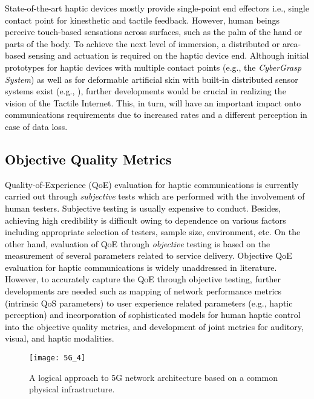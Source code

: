 \documentclass[journal]{IEEEtran}
\begin{document}
\textcolor{black}{State-of-the-art haptic devices mostly provide single-point end effectors i.e., single contact point for kinesthetic and tactile feedback. However, human beings perceive touch-based sensations across surfaces, such as the palm of the hand or parts of the body. To achieve the next level of immersion, a distributed or area-based sensing and actuation is required on the haptic device end. Although initial prototypes for haptic devices with multiple contact points (e.g., the \emph{CyberGrasp System}) as well as for deformable artificial skin with built-in distributed sensor systems exist (e.g., \cite{softskin}), further developments would be crucial in realizing the vision of the Tactile Internet. This, in turn, will have an important impact onto communications requirements due to increased rates and a different perception in case of data loss.}

\subsection{\textcolor{black}{Objective Quality Metrics}}
\textcolor{black}{Quality-of-Experience (QoE) evaluation for haptic communications is currently carried out through \emph{subjective} tests  which are performed with the involvement of human testers. Subjective testing is usually expensive to conduct. Besides, achieving high credibility is difficult owing to dependence on various factors including appropriate selection of testers, sample size, environment, etc. On the other hand, evaluation of QoE through \emph{objective} testing is based on the measurement of several parameters related to service delivery. Objective QoE evaluation for haptic communications is widely unaddressed in literature. However, to accurately capture the QoE through objective testing, further developments are needed such as mapping of network performance metrics (intrinsic QoS parameters) to user experience related parameters (e.g., haptic perception) and incorporation of sophisticated models for human haptic control into the objective quality metrics, and development of joint metrics for auditory, visual, and haptic modalities.}

\begin{figure}
\centering
\texttt{[image: 5G\_4]}
\caption{ A logical \textcolor{black}{approach to 5G }network architecture based on a common physical infrastructure.}
\label{5G_arch}
\end{figure}
\end{document}
